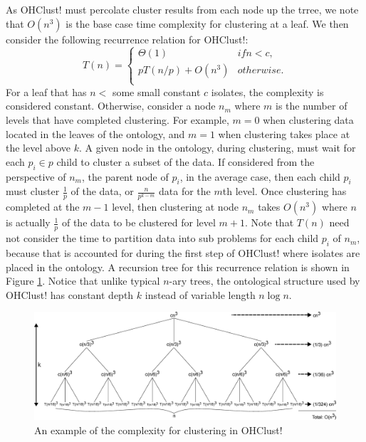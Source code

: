 \documentclass[12pt]{ucthesis}
\begin{document}
      As \textsf{OHClust!} must percolate cluster results from each node up the
      trree, we note that $O(n^{3})$ is the base case time complexity for
      clustering at a leaf. We then consider the following recurrence relation
      for \textsf{OHClust!}:
      $$
         T(n) = \begin{cases}
                  \Theta(1) & if n < c,\\
                  pT(n/p) + O(n^{3}) & otherwise.\\
                \end{cases}
      $$
      For a leaf that has $n <$ some small constant $c$ isolates, the
      complexity is considered constant. Otherwise, consider a node $n_{m}$
      where $m$ is the number of levels that have completed clustering. For
      example, $m=0$ when clustering data located in the leaves of the
      ontology, and $m=1$ when clustering takes place at the level above $k$.
      A given node in the ontology, during clustering, must wait for each
      $p_{i} \in p$ child to cluster a subset of the data. If considered from
      the perspective of $n_{m}$, the parent node of $p_{i}$, in the average
      case, then each child $p_{i}$ must cluster $\frac{1}{p}$ of the data, or
      $\frac{n}{p^{k-m}}$ data for the $m$th level. Once clustering has
      completed at the $m - 1$ level, then clustering at node $n_{m}$ takes
      $O(n^{3})$ where $n$ is actually $\frac{1}{p}$ of the data to be
      clustered for level $m + 1$. Note that $T(n)$ need not
      consider the time to partition data into sub problems for each child
      $p_{i}$ of $n_{m}$, because that is accounted for during the first step
      of \textsf{OHClust!} where isolates are placed in the ontology. A
      recursion tree for this recurrence relation is shown in Figure
      \ref{fig:recursion_tree}. Notice that unlike typical $n$-ary trees, the
      ontological structure used by \textsf{OHClust!} has constant depth $k$
      instead of variable length $n\log n$.

      \begin{figure}[t]
         \centering
         \includegraphics[width=\textwidth]{graphics/recursion_tree.eps}
         \caption{An example of the complexity for clustering in
                  \textsf{OHClust!}}
         \label{fig:recursion_tree}
      \end{figure}
\end{document}
